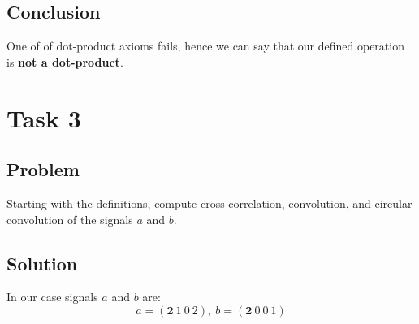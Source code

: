 \documentclass{article}
\begin{document}
\subsection{Conclusion}
One of of dot-product axioms fails, hence we can say that our defined operation is \textbf{not a dot-product}.

\section{Task 3}
\subsection{Problem}
Starting with the definitions, compute cross-correlation, convolution, and circular convolution of the signals $a$ and $b$.
\subsection{Solution}
In our case signals $a$ and $b$ are:
$$a=(\pmb{2}\ 1\ 0\ 2),\ b=(\pmb{2}\ 0\ 0\ 1)$$
\end{document}
